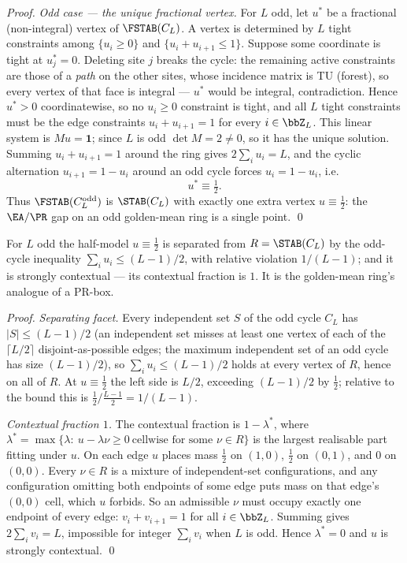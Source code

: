 \begin{proof}
\emph{Odd case --- the unique fractional vertex.} For $L$ odd, let $u^\ast$ be a
fractional (non-integral) vertex of $\FSTAB(C_L)$. A vertex is determined by $L$
tight constraints among $\{u_i\ge0\}$ and $\{u_i+u_{i+1}\le1\}$. Suppose some
coordinate is tight at $u^\ast_j=0$. Deleting site $j$ breaks the cycle: the
remaining active constraints are those of a \emph{path} on the other sites, whose
incidence matrix is TU (forest), so every vertex of that face is integral ---
$u^\ast$ would be integral, contradiction. Hence $u^\ast>0$ coordinatewise, so no
$u_i\ge0$ constraint is tight, and all $L$ tight constraints must be the edge
constraints $u_i+u_{i+1}=1$ for every $i\in\bbZ_L$. This linear system is
$Mu=\mathbf 1$; since $L$ is odd $\det M=2\neq0$, so it has the unique solution.
Summing $u_i+u_{i+1}=1$ around the ring gives $2\sum_i u_i=L$, and the cyclic
alternation $u_{i+1}=1-u_i$ around an odd cycle forces $u_i=1-u_i$, i.e.
\[
  u^\ast \equiv \tfrac12 .
\]
Thus $\FSTAB(C_L^{\mathrm{odd}})$ is $\STAB(C_L)$ with exactly one extra vertex
$u\equiv\tfrac12$: the $\EA/\PR$ gap on an odd golden-mean ring is a single point.
\qed
\end{proof}

\begin{corollary}\label{cor:prbox}
For $L$ odd the half-model $u\equiv\tfrac12$ is separated from $R=\STAB(C_L)$ by
the odd-cycle inequality $\sum_i u_i \le (L-1)/2$, with relative violation
$1/(L-1)$; and it is strongly contextual --- its contextual fraction is $1$. It is
the golden-mean ring's analogue of a PR-box.
\end{corollary}

\begin{proof}
\emph{Separating facet.} Every independent set $S$ of the odd cycle $C_L$ has
$|S|\le(L-1)/2$ (an independent set misses at least one vertex of each of the
$\lceil L/2\rceil$ disjoint-as-possible edges; the maximum independent set of an
odd cycle has size $(L-1)/2$), so $\sum_i u_i\le(L-1)/2$ holds at every vertex of
$R$, hence on all of $R$. At $u\equiv\tfrac12$ the left side is $L/2$, exceeding
$(L-1)/2$ by $\tfrac12$; relative to the bound this is
$\tfrac12 / \tfrac{L-1}{2} = 1/(L-1)$.

\emph{Contextual fraction $1$.} The contextual fraction is $1-\lambda^\ast$, where
$\lambda^\ast=\max\{\lambda:\ u-\lambda\nu\ge0\ \text{cellwise for some }\nu\in R\}$
is the largest realisable part fitting under $u$. On each edge $u$ places mass
$\tfrac12$ on $(1,0)$, $\tfrac12$ on $(0,1)$, and $0$ on $(0,0)$. Every $\nu\in R$
is a mixture of independent-set configurations, and any configuration omitting both
endpoints of some edge puts mass on that edge's $(0,0)$ cell, which $u$ forbids. So
an admissible $\nu$ must occupy exactly one endpoint of every edge: $v_i+v_{i+1}=1$
for all $i\in\bbZ_L$. Summing gives $2\sum_i v_i=L$, impossible for integer
$\sum_i v_i$ when $L$ is odd. Hence $\lambda^\ast=0$ and $u$ is strongly
contextual. \qed
\end{proof}

